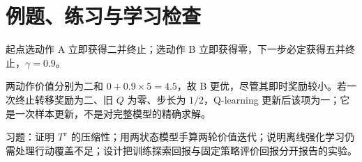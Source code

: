 \section{例题、练习与学习检查}

\begin{example}[即时奖励与长期回报]
起点选动作 A 立即获得二并终止；选动作 B 立即获得零，下一步必定获得五并终止，$\gamma=0.9$。
\end{example}
\begin{solve}
两动作价值分别为二和 $0+0.9\times5=4.5$，故 B 更优，尽管其即时奖励较小。若一次终止转移奖励为二、旧 $Q$ 为零、步长为 $1/2$，Q-learning 更新后该项为一；它是一次样本更新，不是对完整模型的精确求解。
\end{solve}

习题：证明 $T^\pi$ 的压缩性；用两状态模型手算两轮价值迭代；说明离线强化学习仍需处理行动覆盖不足；设计把训练探索回报与固定策略评价回报分开报告的实验。





